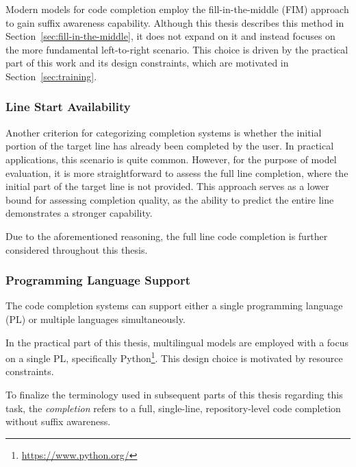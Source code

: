 Modern models for code completion employ the fill-in-the-middle (FIM) approach to gain suffix awareness capability. Although this thesis describes this method in Section~\ref{sec:fill-in-the-middle}, it does not expand on it and instead focuses on the more fundamental left-to-right scenario. This choice is driven by the practical part of this work and its design constraints, which are motivated in Section~\ref{sec:training}.

\subsubsection*{Line Start Availability}

Another criterion for categorizing completion systems is whether the initial portion of the target line has already been completed by the user. In practical applications, this scenario is quite common. However, for the purpose of model evaluation, it is more straightforward to assess the full line completion, where the initial part of the target line is not provided. This approach serves as a lower bound for assessing completion quality, as the ability to predict the entire line demonstrates a stronger capability.

Due to the aforementioned reasoning, the full line code completion is further considered throughout this thesis.

\subsubsection*{Programming Language Support}

The code completion systems can support either a single programming language (PL) or multiple languages simultaneously.

In the practical part of this thesis, multilingual models are employed with a focus on a single PL, specifically Python\footnote{\url{https://www.python.org/}}. This design choice is motivated by resource constraints.
\medskip

To finalize the terminology used in subsequent parts of this thesis regarding this task, the \textit{completion} refers to a full, single-line, repository-level code completion without suffix awareness.
